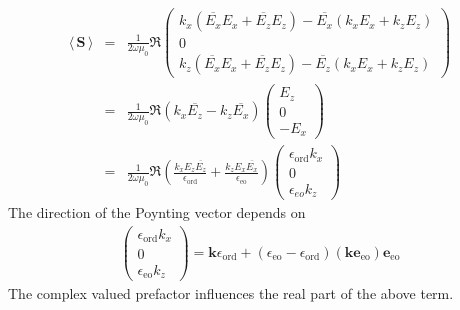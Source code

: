 \documentclass[12pt,a4paper,twoside,openright,BCOR10mm,headsepline,titlepage,abstracton,chapterprefix,final]{scrreprt}
\newcommand\Vector[1]{{\mathbf{#1}}}
\newcommand\vacuum{0}
\newcommand\wavenumber{k}
\newcommand\Wavevector{\Vector{\wavenumber}}
\newcommand\scalarEfield{E}
\newcommand\vacuumpermeability{\mu_{\vacuum}}
\newcommand\scalarpermittivity{\epsilon}
\newcommand\ordi{\text{ord}}
\newcommand\eo{\text{eo}}
\newcommand{\timeavg}[1]{{\langle\,#1\,\rangle}}
\begin{document}
\begin{eqnarray}
 \timeavg{\Vector{S}}
 &=& \frac{1}{2 \omega \vacuumpermeability} \Re 
   \begin{pmatrix}
     \wavenumber_x (\overline{\scalarEfield_x} \scalarEfield_x + \overline{\scalarEfield_z} \scalarEfield_z) - \overline{\scalarEfield_x} (\wavenumber_x \scalarEfield_x + \wavenumber_z \scalarEfield_z )
     \\
     0
     \\
     \wavenumber_z (\overline{\scalarEfield_x} \scalarEfield_x + \overline{\scalarEfield_z} \scalarEfield_z) - \overline{\scalarEfield_z} (\wavenumber_x \scalarEfield_x + \wavenumber_z \scalarEfield_z )     
   \end{pmatrix}
  \\
 &=& \frac{1}{2 \omega \vacuumpermeability} \Re 
   ( \wavenumber_x \overline{\scalarEfield_z} - \wavenumber_z \overline{\scalarEfield_x})
   \begin{pmatrix}
     \scalarEfield_z 
     \\
     0
     \\
     - \scalarEfield_x 
   \end{pmatrix}
  \\
 &=& \frac{1}{2 \omega \vacuumpermeability} \Re 
   \left( \frac{\wavenumber_x \scalarEfield_z \overline{\scalarEfield_z}}{\scalarpermittivity_{\ordi}} + \frac{\wavenumber_z \scalarEfield_x \overline{\scalarEfield_x}}{\scalarpermittivity_{\eo}} \right)
   \begin{pmatrix}
     \scalarpermittivity_{\ordi} \wavenumber_x 
     \\
     0
     \\
     \scalarpermittivity_{eo} \wavenumber_z 
   \end{pmatrix}
\end{eqnarray}
The direction of the Poynting vector depends on
\begin{eqnarray}
   \begin{pmatrix}
     \scalarpermittivity_{\ordi} \wavenumber_x 
     \\
     0
     \\
     \scalarpermittivity_{\eo} \wavenumber_z 
   \end{pmatrix}
   =
   \Wavevector \scalarpermittivity_{\ordi} + (\scalarpermittivity_{\eo} - \scalarpermittivity_{\ordi}) (\Wavevector \Vector{e}_{\eo}) \Vector{e}_{\eo}
\end{eqnarray}
The complex valued prefactor influences the real part of the above term.
\end{document}
